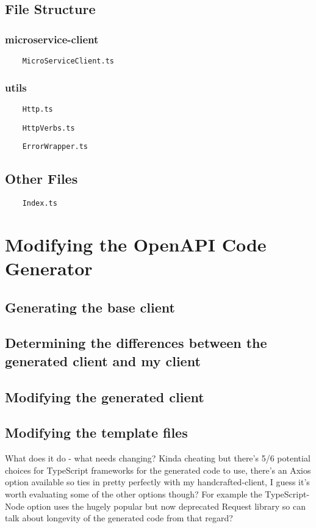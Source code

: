 \subsection{File Structure}
\subsubsection{microservice-client}
\begin{verbatim}
    MicroServiceClient.ts
\end{verbatim}
\subsubsection{utils}
\begin{verbatim}
    Http.ts
\end{verbatim}
\begin{verbatim}
    HttpVerbs.ts
\end{verbatim}
\begin{verbatim}
    ErrorWrapper.ts
\end{verbatim}
\subsection{Other Files}
\begin{verbatim}
    Index.ts
\end{verbatim}

\section{Modifying the OpenAPI Code Generator}
\subsection{Generating the base client}
\subsection{Determining the differences between the generated client and my client}
\subsection{Modifying the generated client}
\subsection{Modifying the template files}
What does it do - what needs changing? Kinda cheating but there's 5/6 potential choices for TypeScript frameworks for the generated code to use, there's an Axios option available so ties in pretty perfectly with my handcrafted-client, I guess it's worth evaluating some of the other options though? For example the TypeScript-Node option uses the hugely popular but now deprecated Request library so can talk about longevity of the generated code from that regard?

